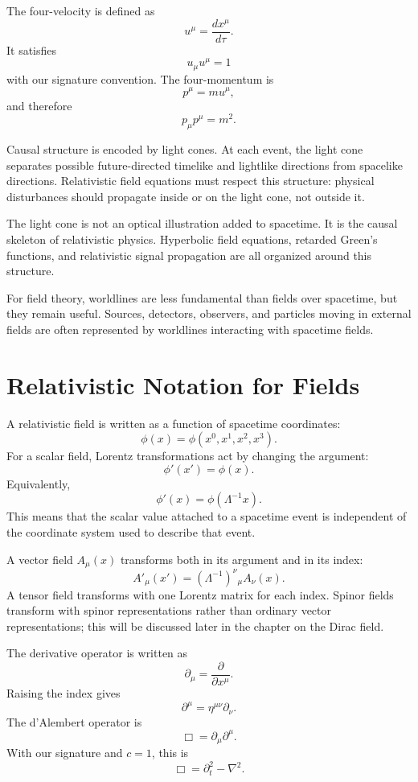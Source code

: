 The four-velocity is defined as
\[
    u^\mu = \frac{dx^\mu}{d\tau}.
\]
It satisfies
\[
    u_\mu u^\mu = 1
\]
with our signature convention. The four-momentum is
\[
    p^\mu = m u^\mu,
\]
and therefore
\[
    p_\mu p^\mu=m^2.
\]

Causal structure is encoded by light cones. At each event, the light cone
separates possible future-directed timelike and lightlike directions from
spacelike directions. Relativistic field equations must respect this structure:
physical disturbances should propagate inside or on the light cone, not outside
it.

\begin{remarkbox}
The light cone is not an optical illustration added to spacetime. It is the
causal skeleton of relativistic physics. Hyperbolic field equations, retarded
Green's functions, and relativistic signal propagation are all organized around
this structure.
\end{remarkbox}

For field theory, worldlines are less fundamental than fields over spacetime,
but they remain useful. Sources, detectors, observers, and particles moving in
external fields are often represented by worldlines interacting with spacetime
fields.

\section{Relativistic Notation for Fields}

A relativistic field is written as a function of spacetime coordinates:
\[
    \phi(x) = \phi(x^0,x^1,x^2,x^3).
\]
For a scalar field, Lorentz transformations act by changing the argument:
\[
    \phi'(x')=\phi(x).
\]
Equivalently,
\[
    \phi'(x)=\phi(\Lambda^{-1}x).
\]
This means that the scalar value attached to a spacetime event is independent
of the coordinate system used to describe that event.

A vector field \(A_\mu(x)\) transforms both in its argument and in its index:
\[
    A'_\mu(x')=(\Lambda^{-1})^\nu{}_{\mu}A_\nu(x).
\]
A tensor field transforms with one Lorentz matrix for each index. Spinor fields
transform with spinor representations rather than ordinary vector
representations; this will be discussed later in the chapter on the Dirac
field.

The derivative operator is written as
\[
    \partial_\mu = \frac{\partial}{\partial x^\mu}.
\]
Raising the index gives
\[
    \partial^\mu=\eta^{\mu\nu}\partial_\nu.
\]
The d'Alembert operator is
\[
    \Box=\partial_\mu\partial^\mu.
\]
With our signature and \(c=1\), this is
\[
    \Box=\partial_t^2-\nabla^2.
\]

